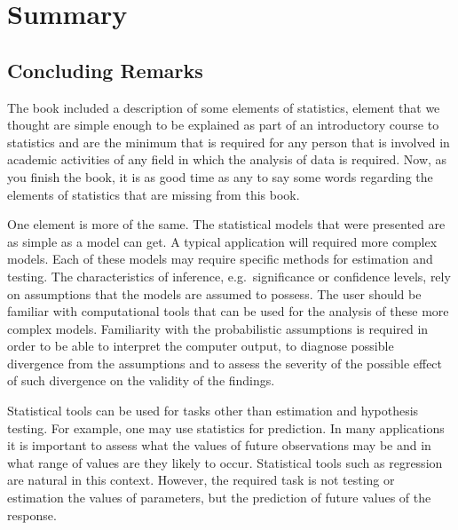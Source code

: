 \documentclass[]{krantz}
\theoremstyle{definition}
\theoremstyle{definition}
\theoremstyle{definition}
\theoremstyle{remark}
\begin{document}
\section{Summary}\label{summary-13}

\subsection{Concluding Remarks}\label{concluding-remarks}

The book included a description of some elements of statistics, element
that we thought are simple enough to be explained as part of an
introductory course to statistics and are the minimum that is required
for any person that is involved in academic activities of any field in
which the analysis of data is required. Now, as you finish the book, it
is as good time as any to say some words regarding the elements of
statistics that are missing from this book.

One element is more of the same. The statistical models that were
presented are as simple as a model can get. A typical application will
required more complex models. Each of these models may require specific
methods for estimation and testing. The characteristics of inference,
e.g.~significance or confidence levels, rely on assumptions that the
models are assumed to possess. The user should be familiar with
computational tools that can be used for the analysis of these more
complex models. Familiarity with the probabilistic assumptions is
required in order to be able to interpret the computer output, to
diagnose possible divergence from the assumptions and to assess the
severity of the possible effect of such divergence on the validity of
the findings.

Statistical tools can be used for tasks other than estimation and
hypothesis testing. For example, one may use statistics for prediction.
In many applications it is important to assess what the values of future
observations may be and in what range of values are they likely to
occur. Statistical tools such as regression are natural in this context.
However, the required task is not testing or estimation the values of
parameters, but the prediction of future values of the response.
\end{document}
